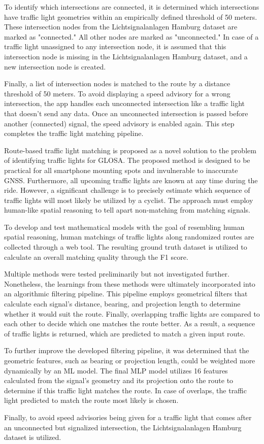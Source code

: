 To identify which intersections are connected, it is determined which intersections have traffic light geometries within an empirically defined threshold of 50 meters. These intersection nodes from the Lichtsignalanlagen Hamburg dataset are marked as "connected." All other nodes are marked as "unconnected." In case of a traffic light unassigned to any intersection node, it is assumed that this intersection node is missing in the Lichtsignalanlagen Hamburg dataset, and a new intersection node is created. 

Finally, a list of intersection nodes is matched to the route by a distance threshold of 50 meters. To avoid displaying a speed advisory for a wrong intersection, the app handles each unconnected intersection like a traffic light that doesn't send any data. Once an unconnected intersection is passed before another (connected) signal, the speed advisory is enabled again. This step completes the traffic light matching pipeline.

\begin{Summary}
Route-based traffic light matching is proposed as a novel solution to the problem of identifying traffic lights for GLOSA. The proposed method is designed to be practical for all smartphone mounting spots and invulnerable to inaccurate GNSS. Furthermore, all upcoming traffic lights are known at any time during the ride. However, a significant challenge is to precisely estimate which sequence of traffic lights will most likely be utilized by a cyclist. The approach must employ human-like spatial reasoning to tell apart non-matching from matching signals.

To develop and test mathematical models with the goal of resembling human spatial reasoning, human matchings of traffic lights along randomized routes are collected through a web tool. The resulting ground truth dataset is utilized to calculate an overall matching quality through the F1 score.

Multiple methods were tested preliminarily but not investigated further. Nonetheless, the learnings from these methods were ultimately incorporated into an algorithmic filtering pipeline. This pipeline employs geometrical filters that calculate each signal's distance, bearing, and projection length to determine whether it would suit the route. Finally, overlapping traffic lights are compared to each other to decide which one matches the route better. As a result, a sequence of traffic lights is returned, which are predicted to match a given input route.

To further improve the developed filtering pipeline, it was determined that the geometric features, such as bearing or projection length, could be weighted more dynamically by an ML model. The final MLP model utilizes 16 features calculated from the signal's geometry and its projection onto the route to determine if this traffic light matches the route. In case of overlaps, the traffic light predicted to match the route most likely is chosen.

Finally, to avoid speed advisories being given for a traffic light that comes after an unconnected but signalized intersection, the Lichtsignalanlagen Hamburg dataset is utilized. 
\end{Summary}

